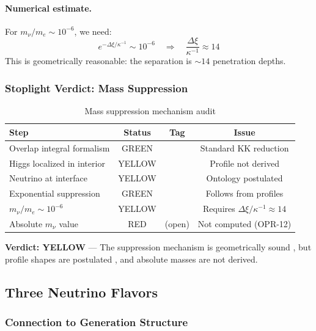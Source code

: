 \paragraph{Numerical estimate.}
For $m_\nu/m_e \sim 10^{-6}$, we need:
\begin{equation}
    e^{-\Delta\xi / \kappa^{-1}} \sim 10^{-6}
    \quad\Longrightarrow\quad
    \frac{\Delta\xi}{\kappa^{-1}} \approx 14
\end{equation}
This is geometrically reasonable: the separation is $\sim 14$ penetration depths.

\subsubsection{Stoplight Verdict: Mass Suppression}

\begin{table}[ht]
\centering
\caption{Mass suppression mechanism audit}
\label{tab:ch6_mass_stoplight}
\begin{tabular}{lccc}
\toprule
\textbf{Step} & \textbf{Status} & \textbf{Tag} & \textbf{Issue} \\
\midrule
Overlap integral formalism & GREEN & \tagBL{} & Standard KK reduction \\
Higgs localized in interior & YELLOW & \tagP{} & Profile not derived \\
Neutrino at interface & YELLOW & \tagP{} & Ontology postulated \\
Exponential suppression & GREEN & \tagDc{} & Follows from profiles \\
$m_\nu/m_e \sim 10^{-6}$ & YELLOW & \tagI{} & Requires $\Delta\xi/\kappa^{-1} \approx 14$ \\
Absolute $m_\nu$ value & RED & (open) & Not computed (OPR-12) \\
\bottomrule
\end{tabular}
\end{table}

\textbf{Verdict: YELLOW} --- The suppression mechanism is geometrically sound
\tagDc{}, but profile shapes are postulated \tagP{}, and absolute masses are
not derived.

\subsection{Three Neutrino Flavors}
\label{sec:ch6_three_flavors}

\subsubsection{Connection to Generation Structure}

